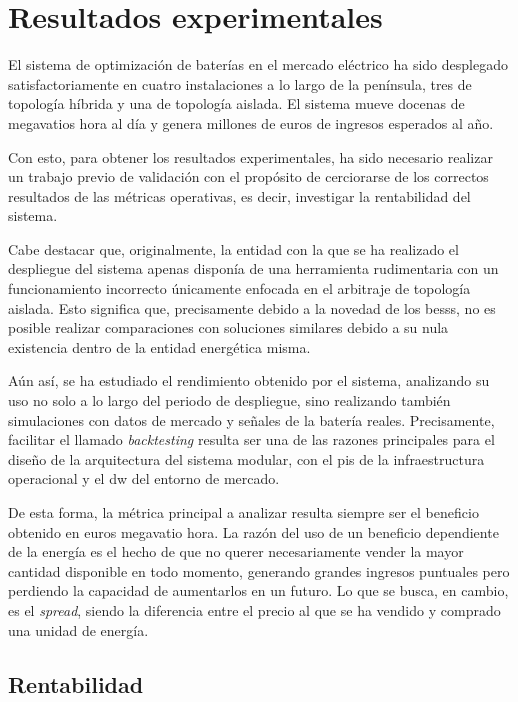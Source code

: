 
\cleardoublepage%

\chapter{Resultados experimentales}%
\label{makereference7}

El sistema de optimización de baterías en el mercado eléctrico ha sido desplegado satisfactoriamente en cuatro instalaciones a lo largo de la península, tres de topología híbrida y una de topología aislada. El sistema mueve docenas de megavatios hora al día y genera millones de euros de ingresos esperados al año.

Con esto, para obtener los resultados experimentales, ha sido necesario realizar un trabajo previo de validación con el propósito de cerciorarse de los correctos resultados de las métricas operativas, es decir, investigar la rentabilidad del sistema.

Cabe destacar que, originalmente, la entidad con la que se ha realizado el despliegue del sistema apenas disponía de una herramienta rudimentaria con un funcionamiento incorrecto únicamente enfocada en el arbitraje de topología aislada. Esto significa que, precisamente debido a la novedad de los \glspl{bess}, no es posible realizar comparaciones con soluciones similares debido a su nula existencia dentro de la entidad energética misma.

Aún así, se ha estudiado el rendimiento obtenido por el sistema, analizando su uso no solo a lo largo del periodo de despliegue, sino realizando también simulaciones con datos de mercado y señales de la batería reales. Precisamente, facilitar el llamado \textit{backtesting} resulta ser una de las razones principales para el diseño de la arquitectura del sistema modular, con el \gls{pis} de la infraestructura operacional y el \gls{dw} del entorno de mercado.

De esta forma, la métrica principal a analizar resulta siempre ser el beneficio obtenido en euros megavatio hora. La razón del uso de un beneficio dependiente de la energía es el hecho de que no querer necesariamente vender la mayor cantidad disponible en todo momento, generando grandes ingresos puntuales pero perdiendo la capacidad de aumentarlos en un futuro. Lo que se busca, en cambio, es el \textit{spread}, siendo la diferencia entre el precio al que se ha vendido y comprado una unidad de energía.

\section{Rentabilidad}%
\label{makereference7.1}

